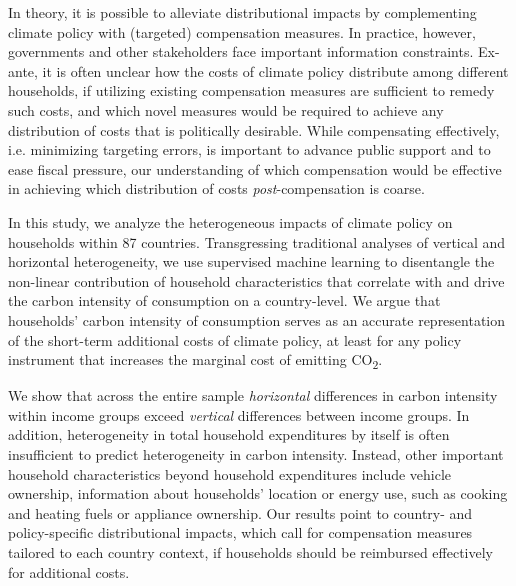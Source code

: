 \documentclass[12pt, a4paper]{article}
\begin{document}
In theory, it is possible to alleviate distributional impacts by complementing climate policy with (targeted) compensation measures. In practice, however, governments and other stakeholders face important information constraints. Ex-ante, it is often unclear how the costs of climate policy distribute among different households, if utilizing existing compensation measures are sufficient to remedy such costs, and which novel measures would be required to achieve any distribution of costs that is politically desirable. While compensating effectively, i.e. minimizing targeting errors, is important to advance public support and to ease fiscal pressure, our understanding of which compensation would be effective in achieving which distribution of costs \textit{post}-compensation is coarse.

In this study, we analyze the heterogeneous impacts of climate policy on households within 87 countries. Transgressing traditional analyses of vertical and horizontal heterogeneity, we use supervised machine learning to disentangle the non-linear contribution of household characteristics that correlate with and drive the carbon intensity of consumption on a country-level. We argue that households' carbon intensity of consumption serves as an accurate representation of the short-term additional costs of climate policy, at least for any policy instrument that increases the marginal cost of emitting CO\textsubscript{2}.

We show that across the entire sample \textit{horizontal} differences in carbon intensity within income groups exceed \textit{vertical} differences between income groups. In addition, heterogeneity in total household expenditures by itself is often insufficient to predict heterogeneity in carbon intensity. Instead, other important household characteristics beyond household expenditures include vehicle ownership, information about households' location or energy use, such as cooking and heating fuels or appliance ownership. Our results point to country- and policy-specific distributional impacts, which call for compensation measures tailored to each country context, if households should be reimbursed effectively for additional costs. 
\end{document}
